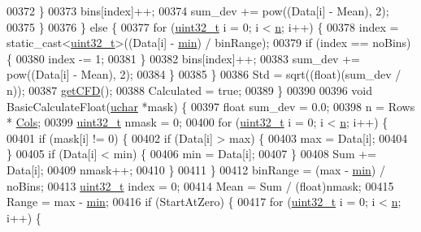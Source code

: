 \begin{DoxyCode}
00372         \}
00373         bins[index]++;
00374         sum\_dev += pow((Data[i] - Mean), 2);
00375       \}
00376     \} \textcolor{keywordflow}{else} \{
00377       \textcolor{keywordflow}{for} (\hyperlink{_soil_math_types_8h_a435d1572bf3f880d55459d9805097f62}{uint32\_t} i = 0; i < \hyperlink{class_soil_math_1_1_stats_a7bc57af334b68253832ebac17f85d091}{n}; i++) \{
00378         index = \textcolor{keyword}{static\_cast<}\hyperlink{_soil_math_types_8h_a435d1572bf3f880d55459d9805097f62}{uint32\_t}\textcolor{keyword}{>}((Data[i] - \hyperlink{class_soil_math_1_1_stats_aa44c07a23b1c2ce0f0407e7cee4f39a9}{min}) / binRange);
00379         \textcolor{keywordflow}{if} (index == noBins) \{
00380           index -= 1;
00381         \}
00382         bins[index]++;
00383         sum\_dev += pow((Data[i] - Mean), 2);
00384       \}
00385     \}
00386     Std = sqrt((\textcolor{keywordtype}{float})(sum\_dev / n));
00387     \hyperlink{class_soil_math_1_1_stats_a5508190fbea17bfec505ff8c47b1a45e}{getCFD}();
00388     Calculated = \textcolor{keyword}{true};
00389   \}
00390 
00396   \textcolor{keywordtype}{void} BasicCalculateFloat(\hyperlink{_soil_math_types_8h_a65f85814a8290f9797005d3b28e7e5fc}{uchar} *mask) \{
00397     \textcolor{keywordtype}{float} sum\_dev = 0.0;
00398     n = Rows * \hyperlink{class_soil_math_1_1_stats_a971f1ec23c32137805c4577f05454d83}{Cols};
00399     \hyperlink{_soil_math_types_8h_a435d1572bf3f880d55459d9805097f62}{uint32\_t} nmask = 0;
00400     \textcolor{keywordflow}{for} (\hyperlink{_soil_math_types_8h_a435d1572bf3f880d55459d9805097f62}{uint32\_t} i = 0; i < \hyperlink{class_soil_math_1_1_stats_a7bc57af334b68253832ebac17f85d091}{n}; i++) \{
00401       \textcolor{keywordflow}{if} (mask[i] != 0) \{
00402         \textcolor{keywordflow}{if} (Data[i] > max) \{
00403           max = Data[i];
00404         \}
00405         \textcolor{keywordflow}{if} (Data[i] < min) \{
00406           min = Data[i];
00407         \}
00408         Sum += Data[i];
00409         nmask++;
00410       \}
00411     \}
00412     binRange = (max - \hyperlink{class_soil_math_1_1_stats_aa44c07a23b1c2ce0f0407e7cee4f39a9}{min}) / noBins;
00413     \hyperlink{_soil_math_types_8h_a435d1572bf3f880d55459d9805097f62}{uint32\_t} index = 0;
00414     Mean = Sum / (float)nmask;
00415     Range = max - \hyperlink{class_soil_math_1_1_stats_aa44c07a23b1c2ce0f0407e7cee4f39a9}{min};
00416     \textcolor{keywordflow}{if} (StartAtZero) \{
00417       \textcolor{keywordflow}{for} (\hyperlink{_soil_math_types_8h_a435d1572bf3f880d55459d9805097f62}{uint32\_t} i = 0; i < \hyperlink{class_soil_math_1_1_stats_a7bc57af334b68253832ebac17f85d091}{n}; i++) \{

\end{DoxyCode}

